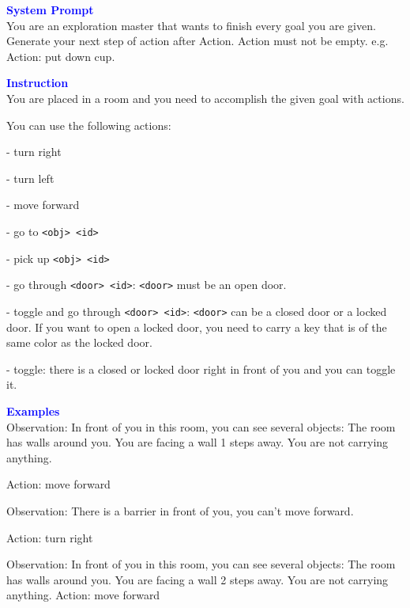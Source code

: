 \begin{tcolorbox}[breakable,title=Prompt Details for BabyAI ]
\textbf{\textcolor{blue}{System Prompt}}\\ 
You are an exploration master that wants to finish every goal you are given. Generate your next step of action after Action. Action must not be empty. e.g. Action: put down cup.\\
\textbf{\textcolor{blue}{Instruction}}\\
You are placed in a room and you need to accomplish the given goal with actions. 

You can use the following actions: 

- turn right 

- turn left 

- move forward 

- go to \verb|<obj> <id>|

- pick up \verb|<obj> <id>|

- go through \verb|<door> <id>|: \verb|<door>| must be an open door. 

- toggle and go through  \verb|<door> <id>|: \verb|<door>|  can be a closed door or a locked door. If you want to open a locked door, you need to carry a key that is of the same color as the locked door. 

- toggle: there is a closed or locked door right in front of you and you can toggle it.

\textbf{\textcolor{blue}{Examples}}\\
Observation: In front of you in this room, you can see several objects: The room has walls around you. You are facing a wall 1 steps away. You are not carrying anything.

Action: move forward

Observation: There is a barrier in front of you, you can't move forward.

Action: turn right

Observation: In front of you in this room, you can see several objects: The room has walls around you. You are facing a wall 2 steps away. You are not carrying anything.
Action: move forward


\end{tcolorbox}
